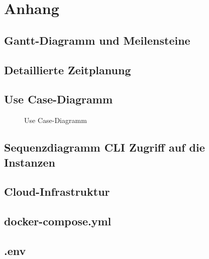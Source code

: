 \section{Anhang}
\label{sec:Anhang}
\subsection{Gantt-Diagramm und Meilensteine}
\label{app:Gantt}
\clearpage

\subsection{Detaillierte Zeitplanung}
\label{app:Zeitplanung}
\clearpage

\subsection{Use Case-Diagramm}
\label{app:UseCase}
\begin{figure}[htb]
\centering
{}
\caption{Use Case-Diagramm}
\end{figure}
\clearpage

\subsection{Sequenzdiagramm CLI Zugriff auf die Instanzen}
\label{app:Sequenzdiagramm CLI Zugriff auf die Instanzen}
\clearpage

\subsection{Cloud-Infrastruktur}
\label{app:Cloud-Infrastruktur}
\begin{figure}[htb]
    \centering
\end{figure}
\pagebreak

\subsection{docker-compose.yml}
\label{app:docker-compose.yml}

\subsection{.env}
\label{app:dotenv}

